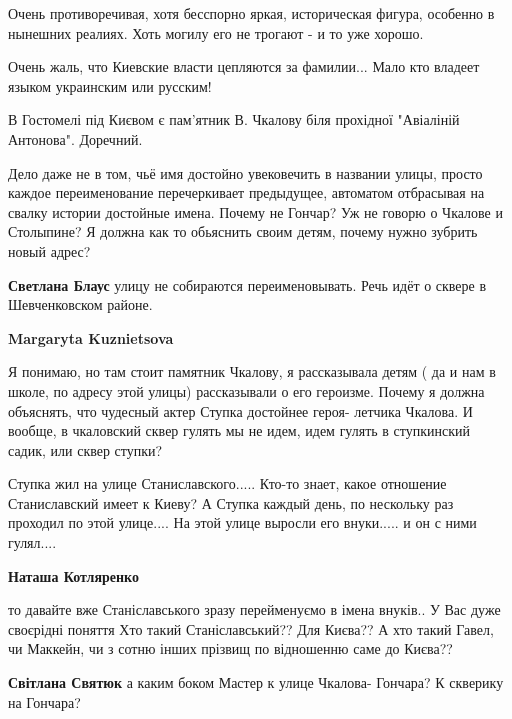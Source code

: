 \begin{itemize}
\begin{itemize}
Очень противоречивая, хотя бесспорно яркая, историческая фигура, особенно в
нынешних реалиях. Хоть могилу его не трогают - и то уже хорошо.

\end{itemize} %

Очень жаль, что Киевские власти цепляются за фамилии... Мало кто владеет языком украинским или русским!

В Гостомелі під Києвом є пам'ятник В. Чкалову біля прохідної "Авіаліній Антонова". Доречний.


Дело даже не в том, чьё имя достойно увековечить в названии улицы, просто
каждое переименование перечеркивает предыдущее, автоматом отбрасывая на свалку
истории достойные имена. Почему не Гончар? Уж не говорю о Чкалове и Столыпине?
Я должна как то обьяснить своим детям, почему нужно зубрить новый адрес?

\begin{itemize} %
\textbf{Светлана Блаус} улицу не собираются переименовывать. Речь идёт о сквере в Шевченковском районе.

\textbf{Margaryta Kuznietsova} 

Я понимаю, но там стоит памятник Чкалову, я рассказывала детям ( да и нам в
школе, по адресу этой улицы) рассказывали о его героизме. Почему я должна
объяснять, что чудесный актер Ступка достойнее героя- летчика Чкалова. И
вообще, в чкаловский сквер гулять мы не идем, идем гулять в ступкинский садик,
или сквер ступки?

\end{itemize} %


Ступка жил на улице Станиславского..... Кто-то знает, какое отношение
Станиславский имеет к Киеву? А Ступка каждый день, по нескольку раз проходил по
этой улице.... На этой улице выросли его внуки..... и он с ними гулял....

\begin{itemize} %
\textbf{Наташа Котляренко} 

то давайте вже Станіславського зразу перейменуємо в імена внуків.. У Вас дуже
своєрідні поняття Хто такий Станіславський?? Для Києва?? А хто такий Гавел, чи
Маккейн, чи з сотню інших прізвищ по відношенню саме до Києва??


\textbf{Світлана Святюк} а каким боком Мастер к улице Чкалова- Гончара? К скверику на Гончара?


\end{itemize}
\end{itemize}
